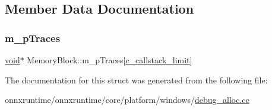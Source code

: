 \subsection{Member Data Documentation}
\mbox{\label{structMemoryBlock_acded2b4a70f3a22a6822c382e2e95781}} 
\subsubsection{\texorpdfstring{m\+\_\+p\+Traces}{m\_pTraces}}
{\footnotesize\ttfamily \mbox{\hyperlink{mlasi_8h_a88f941d423cb2a819b70a1358982b1a6}{void}}$\ast$ Memory\+Block\+::m\+\_\+p\+Traces\mbox{[}\mbox{\hyperlink{debug__alloc_8cc_a1577d57cd8e28bfab7c0436ee2eb67c1}{c\+\_\+callstack\+\_\+limit}}\mbox{]}}



The documentation for this struct was generated from the following file\+:\begin{DoxyCompactItemize}
\item 
onnxruntime/onnxruntime/core/platform/windows/\mbox{\hyperlink{debug__alloc_8cc}{debug\+\_\+alloc.\+cc}}\end{DoxyCompactItemize}
